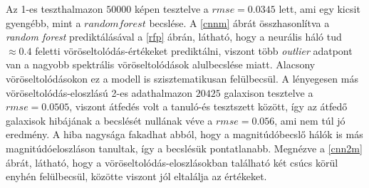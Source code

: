 \documentclass[12pt,letterpaper,oneside,openright]{book}
\begin{document}
\newline\indent
 Az 1-es teszthalmazon $\num{50000}$ képen tesztelve a $\textit{rmse} = 0.0345$ lett, ami egy kicsit gyengébb, mint a $random forest$ becslése. A \ref{cnnm} ábrát összhasonlítva a \textit{random forest} prediktálásával a \ref{rfp} ábrán, látható, hogy a neurális háló tud  $\approx 0.4$ feletti vöröseltolódás-értékeket prediktálni, viszont több \textit{outlier} adatpont van a nagyobb spektrális vöröseltolódások alulbecslése miatt. Alacsony vöröseltolódásokon ez a modell is szisztematikusan felülbecsül. A lényegesen más vöröseltolódás-eloszlású 2-es adathalmazon $\num{20425}$ galaxison tesztelve a $\textit{rmse} = 0.0505$, viszont átfedés volt a tanuló-és tesztszett között, így az átfedő galaxisok hibájának a becslését nullának véve a $rmse =  0.056$, ami nem túl jó eredmény. A hiba nagysága fakadhat abból, hogy a magnitúdóbecslő hálók is más magnitúdóeloszláson tanultak, így a becslésük pontatlanabb. Megnézve a \ref{cnn2m} ábrát, látható, hogy a vöröseltolódás-eloszlásokban található két csúcs körül enyhén felülbecsül, közötte viszont jól eltalálja az értékeket.
\end{document}
